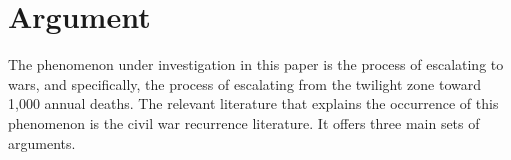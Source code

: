 \documentclass [11pt]{article}
\begin{document}





\section*{Argument}

The phenomenon under investigation in this paper is the process of escalating to wars, and specifically, the process of escalating from the twilight zone toward 1,000 annual deaths. The relevant literature that explains the occurrence of this phenomenon is the civil war recurrence literature. It offers three main sets of arguments.
\end{document}
